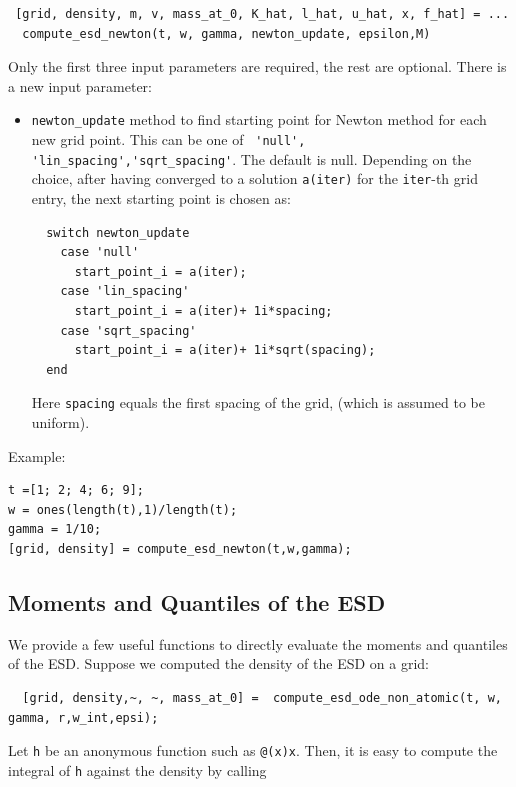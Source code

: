 \documentclass[english,11pt]{article} %
\begin{document}
\begin{verbatim}
 [grid, density, m, v, mass_at_0, K_hat, l_hat, u_hat, x, f_hat] = ...
  compute_esd_newton(t, w, gamma, newton_update, epsilon,M)
\end{verbatim}


Only the first three input parameters are required, the rest are optional. There is a new input parameter: 

\begin{itemize}
\item \verb+newton_update+ method to find starting point for Newton method for each new grid point. This can be one of  \verb+ 'null', 'lin_spacing','sqrt_spacing'+. The default is null. Depending on the choice, after having converged to a solution \verb+a(iter)+ for the  \verb+iter+-th grid entry, the next starting point is chosen as: 

\begin{verbatim}
  switch newton_update
    case 'null'
      start_point_i = a(iter);
    case 'lin_spacing'
      start_point_i = a(iter)+ 1i*spacing;
    case 'sqrt_spacing'
      start_point_i = a(iter)+ 1i*sqrt(spacing);
  end
\end{verbatim}
Here \verb+spacing+ equals the first spacing of the grid, (which is assumed to be uniform). 
\end{itemize}

Example: 

\begin{verbatim}
t =[1; 2; 4; 6; 9];
w = ones(length(t),1)/length(t);
gamma = 1/10;
[grid, density] = compute_esd_newton(t,w,gamma);
\end{verbatim}

\subsection{Moments and Quantiles of the ESD}

We provide a few useful functions to directly evaluate the moments and quantiles of the ESD. Suppose we computed the density of the ESD on a grid:

\begin{verbatim}
  [grid, density,~, ~, mass_at_0] =  compute_esd_ode_non_atomic(t, w, gamma, r,w_int,epsi);
\end{verbatim}

Let \verb+h+ be an anonymous function such as \verb+@(x)x+. Then, it is easy to compute the integral of \verb+h+ against the density by calling 
\end{document}
